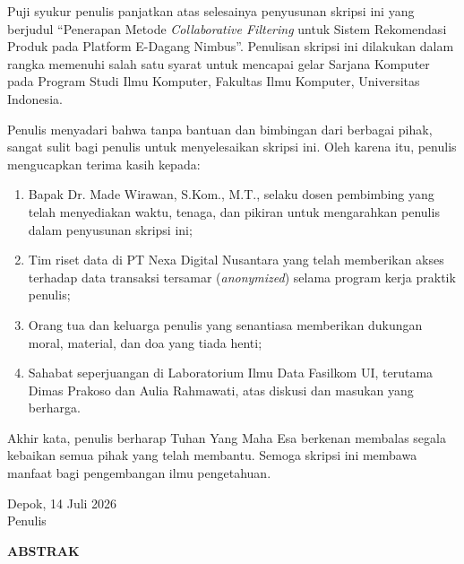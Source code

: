 \documentclass[12pt,a4paper]{report}
\begin{document}
\begin{onehalfspace}
\noindent
Puji syukur penulis panjatkan atas selesainya penyusunan skripsi ini yang
berjudul ``Penerapan Metode \emph{Collaborative Filtering} untuk Sistem
Rekomendasi Produk pada Platform E-Dagang Nimbus''. Penulisan skripsi ini
dilakukan dalam rangka memenuhi salah satu syarat untuk mencapai gelar
Sarjana Komputer pada Program Studi Ilmu Komputer, Fakultas Ilmu Komputer,
Universitas Indonesia.

Penulis menyadari bahwa tanpa bantuan dan bimbingan dari berbagai pihak,
sangat sulit bagi penulis untuk menyelesaikan skripsi ini. Oleh karena itu,
penulis mengucapkan terima kasih kepada:
\begin{enumerate}
  \item Bapak Dr. Made Wirawan, S.Kom., M.T., selaku dosen pembimbing yang
    telah menyediakan waktu, tenaga, dan pikiran untuk mengarahkan penulis
    dalam penyusunan skripsi ini;
  \item Tim riset data di PT Nexa Digital Nusantara yang telah memberikan
    akses terhadap data transaksi tersamar (\emph{anonymized}) selama
    program kerja praktik penulis;
  \item Orang tua dan keluarga penulis yang senantiasa memberikan dukungan
    moral, material, dan doa yang tiada henti;
  \item Sahabat seperjuangan di Laboratorium Ilmu Data Fasilkom UI, terutama
    Dimas Prakoso dan Aulia Rahmawati, atas diskusi dan masukan yang berharga.
\end{enumerate}

Akhir kata, penulis berharap Tuhan Yang Maha Esa berkenan membalas segala
kebaikan semua pihak yang telah membantu. Semoga skripsi ini membawa manfaat
bagi pengembangan ilmu pengetahuan.

\vspace{1cm}
\begin{flushright}
Depok, 14 Juli 2026 \\[4pt]
Penulis
\end{flushright}
\end{onehalfspace}

\newpage
\thispagestyle{plain}
\begin{center}
{\bfseries\color{uinavy}\large ABSTRAK}
\end{center}
\vspace{0.4cm}
\end{document}
